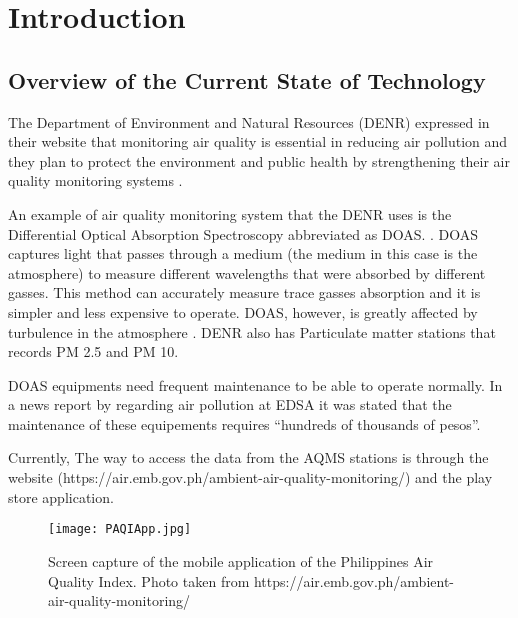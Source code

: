 \chapter{Introduction}
\label{sec:researchdesc}    %

\section{Overview of the Current State of Technology}
\label{sec:overview}
The Department of Environment and Natural Resources (DENR) expressed in their website that monitoring air quality is essential in reducing air pollution and they plan to protect the environment and public health by strengthening their air quality monitoring systems \cite{DENR2020}.

An example of air quality monitoring system that the DENR uses is the Differential Optical Absorption Spectroscopy abbreviated as DOAS. \cite{DENR_ND}. DOAS captures light that passes through a medium (the medium in this case is the atmosphere) to measure different wavelengths that were absorbed by different gasses. This method can accurately measure trace gasses absorption and it is simpler and less expensive to operate. DOAS, however, is greatly affected by turbulence in the atmosphere \cite{PlattEtAl2008}. DENR also has Particulate matter stations that records PM 2.5 and PM 10. \cite{DENR_ND}

DOAS equipments need frequent maintenance to be able to operate normally. In a news report by \cite{enano_subingsubing_2019} regarding air pollution at EDSA it was stated that the maintenance of these equipements requires “hundreds of thousands of pesos”.

Currently, The way to access the data from the AQMS stations is through the website (https://air.emb.gov.ph/ambient-air-quality-monitoring/) and the play store application.

  
\begin{figure}[t]                %
   \centering                    %
   \texttt{[image: PAQIApp.jpg]}      %
   \caption{Screen capture of the mobile application of the Philippines Air Quality Index. Photo taken from https://air.emb.gov.ph/ambient-air-quality-monitoring/ 
}
    \label{fig:PAQIApp}
\end{figure}


